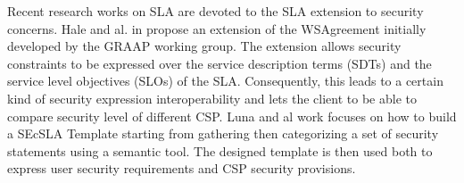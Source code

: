 


Recent research works on SLA are devoted to the SLA extension to security concerns. Hale
and al. in \cite{6274042} propose an extension of the WSAgreement initially developed by the GRAAP
working group. The extension allows security constraints to be expressed over the service description
terms (SDTs) and the service level objectives (SLOs) of the SLA. Consequently, this leads to a certain kind of security expression interoperability and lets the client to be able to compare security level of different CSP. Luna and al
work \cite{LunaGarcia:2012:BCS:2381913.2381932} focuses on how to build a SEcSLA Template starting from gathering then categorizing a set of security statements using a semantic tool. The designed template is then used both to express user security requirements and CSP security provisions.

